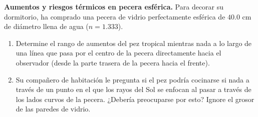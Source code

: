 \item \textbf{Aumentos y riesgos térmicos en pecera esférica.}
Para decorar su dormitorio, ha comprado una pecera de vidrio perfectamente esférica de $40.0\text{ cm}$ de diámetro llena de agua ($n = 1.333$).
\begin{enumerate}
    \item Determine el rango de aumentos del pez tropical mientras nada a lo largo de una línea que pasa por el centro de la pecera directamente hacia el observador (desde la parte trasera de la pecera hacia el frente).
    \item Su compañero de habitación le pregunta si el pez podría cocinarse si nada a través de un punto en el que los rayos del Sol se enfocan al pasar a través de los lados curvos de la pecera. ¿Debería preocuparse por esto? Ignore el grosor de las paredes de vidrio.
\end{enumerate}